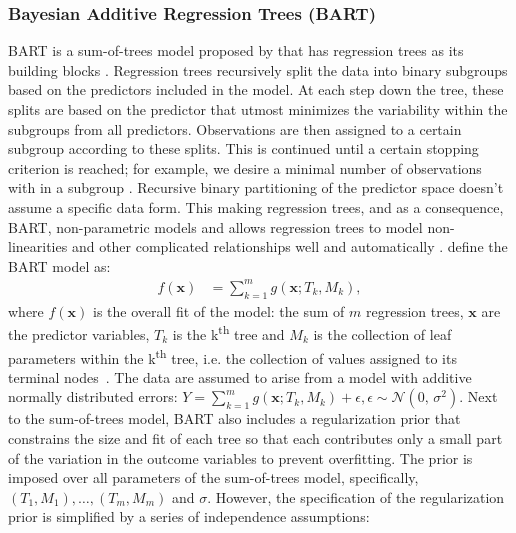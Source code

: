 \documentclass[10pt, a4paper, titlepage]{article}
\begin{document}
\subsubsection{Bayesian Additive Regression Trees (BART)}
BART is a sum-of-trees model proposed by \citet{chipman2010} that has regression trees as its building blocks \citep{chipman2010, hill2020, james2021}. Regression trees recursively split the data into binary subgroups based on the predictors included in the model. At each step down the tree, these splits are based on the predictor that utmost minimizes the variability within the subgroups from all predictors. Observations are then assigned to a certain subgroup according to these splits. This is continued until a certain stopping criterion is reached; for example, we desire a minimal number of observations with in a subgroup \citep{hastie2017, james2021, salditt2023, breiman1984}. Recursive binary partitioning of the predictor space doesn't assume a specific data form. This making regression trees, and as a consequence, BART, non-parametric models \citep{hastie2017, james2021, salditt2023, breiman1984} and allows regression trees to model non-linearities and other complicated relationships well and automatically \citep{hill2020, burgette2010}.
\citet{chipman2010} define the BART model as:
\begin{align}
\label{eq:BART}
f(\textbf{x}) &= \sum^{m}_{k=1}g(\textbf{x}; T_{k}, M_{k}),
\end{align} where $f(\mathbf{x})$ is the overall fit of the model: the sum of $m$ regression trees, $\textbf{x}$ are the predictor variables, $T_{k}$ is the k\textsuperscript{th} tree and $M_{k}$ is the collection of leaf parameters within the k\textsuperscript{th} tree, i.e. the collection of values assigned to its terminal nodes~\citep{chipman2010, hill2020, james2021, chipman1998, chipman2006}. The data are assumed to arise from a model with additive normally distributed errors: $Y = \sum^{m}_{k=1}g(\textbf{x}; T_{k}, M_{k}) + \epsilon, \epsilon \sim \mathcal{N}(0,\,\sigma^{2})$.
Next to the sum-of-trees model, BART also includes a regularization prior that constrains the size and fit of each tree so that each contributes only a small part of the variation in the outcome variables to prevent overfitting. The prior is imposed over all parameters of the sum-of-trees model, specifically, $(T_1, M_1), \dots, (T_m, M_m)$ and $\sigma$. However, the specification of the regularization prior is simplified by a series of independence assumptions: 
\end{document}
